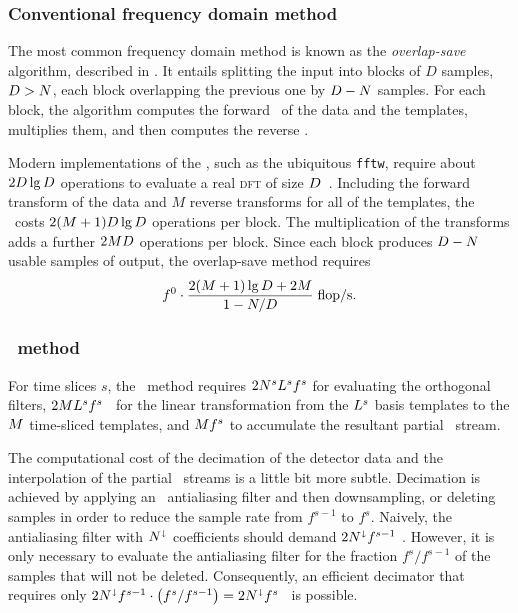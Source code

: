 \subsubsection{Conventional frequency domain method}

The most common frequency domain method is known as the \emph{overlap-save} algorithm, described in \cite{numerical-recipes-chapter-13}.  It entails splitting the input into blocks of $D$ samples, $D > N$, each block overlapping the previous one by $D - N$ samples.  For each block, the algorithm computes the forward \fft\ of the data and the templates, multiplies them, and then computes the reverse \fft.

Modern implementations of the \fft, such as the ubiquitous \texttt{fftw}, require about $2 D \lg D$ operations to evaluate a real \textsc{dft} of size $D$~\cite{Johnson:2007p9654}.  Including the forward transform of the data and $M$ reverse transforms for all of the templates, the \fft\ costs $2 (M + 1) D \lg D$ operations per block.  The multiplication of the transforms adds a further $2 M D$ operations per block.  Since each block produces $D - N$ usable samples of output, the overlap-save method requires
$$
f^0 \cdot \frac{2 (M + 1) \lg D + 2 M}{1 - N/D} \; \mathrm{flop/s}.
$$

\subsubsection{\lloid\ method}

For time slices $s$, the \lloid\ method requires $2 N^s L^s f^s$ for evaluating the orthogonal filters, $2 M L^s f^s$ \flops\ for the linear transformation from the $L^s$ basis templates to the $M$ time-sliced templates, and $M f^s$ \flops to accumulate the resultant partial \SNR\ stream.

The computational cost of the decimation of the detector data and the interpolation of the partial \SNR\ streams is a little bit more subtle.  Decimation is achieved by applying an \fir\ antialiasing filter and then downsampling, or deleting samples in order to reduce the sample rate from $f^{s-1}$ to $f^s$.  Naively, the antialiasing filter with $N^\shortdownarrow$ coefficients should demand $2 N^\shortdownarrow f^{s-1}$ \flops.  However, it is only necessary to evaluate the antialiasing filter for the fraction $f^s / f^{s-1}$ of the samples that will not be deleted.  Consequently, an efficient decimator that requires only $2 N^\shortdownarrow f^{s-1} \cdot \left( f^s / f^{s-1} \right) = 2 N^\shortdownarrow f^s$ \flops\ is possible.

